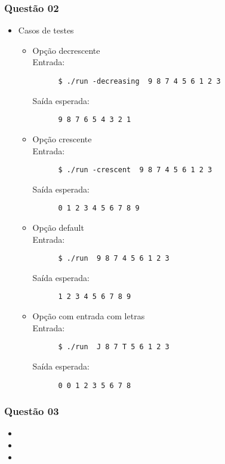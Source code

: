 \documentclass[11pt,a4paper]{article}
\begin{document}
\subsubsection{Questão 02}
\begin{itemize}
  \item Casos de testes
  \begin{itemize}
    \item Opção decrescente \\
    Entrada:
    \begin{verbatim}
      $ ./run -decreasing  9 8 7 4 5 6 1 2 3
    \end{verbatim}
    Saída esperada:
    \begin{verbatim}
      9 8 7 6 5 4 3 2 1
    \end{verbatim}
  \end{itemize}

  \begin{itemize}
    \item Opção crescente \\
    Entrada:
    \begin{verbatim}
      $ ./run -crescent  9 8 7 4 5 6 1 2 3
    \end{verbatim}
    Saída esperada:
    \begin{verbatim}
      0 1 2 3 4 5 6 7 8 9
    \end{verbatim}
  \end{itemize}

  \begin{itemize}
    \item Opção default \\
    Entrada:
    \begin{verbatim}
      $ ./run  9 8 7 4 5 6 1 2 3
    \end{verbatim}
    Saída esperada:
    \begin{verbatim}
      1 2 3 4 5 6 7 8 9
    \end{verbatim}
  \end{itemize}

  \begin{itemize}
    \item Opção com entrada com letras \\
    Entrada:
    \begin{verbatim}
      $ ./run  J 8 7 T 5 6 1 2 3
    \end{verbatim}
    Saída esperada:
    \begin{verbatim}
      0 0 1 2 3 5 6 7 8
    \end{verbatim}
  \end{itemize}



\end{itemize}

\subsubsection{Questão 03}
\begin{itemize}
  \item
  \item
  \item
\end{itemize}
\end{document}
